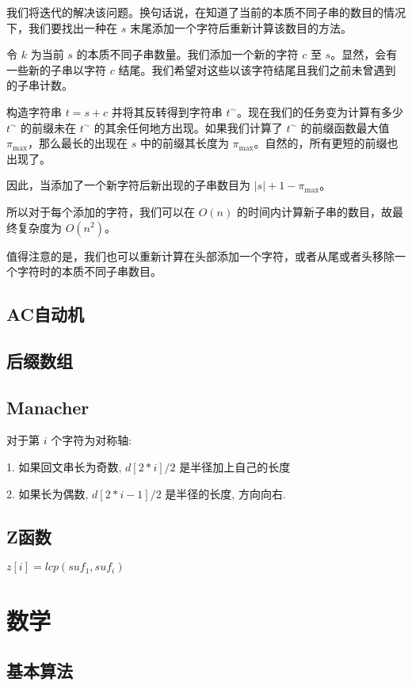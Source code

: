 \documentclass[a4paper]{article}
\begin{document}
我们将迭代的解决该问题。换句话说，在知道了当前的本质不同子串的数目的情况下，我们要找出一种在 $s$ 末尾添加一个字符后重新计算该数目的方法。

令 $k$ 为当前 $s$ 的本质不同子串数量。我们添加一个新的字符 $c$ 至 $s$。显然，会有一些新的子串以字符 $c$ 结尾。我们希望对这些以该字符结尾且我们之前未曾遇到的子串计数。

构造字符串 $t = s + c$ 并将其反转得到字符串 $t^{\sim}$。现在我们的任务变为计算有多少 $t^{\sim}$ 的前缀未在 $t^{\sim}$ 的其余任何地方出现。如果我们计算了 $t^{\sim}$ 的前缀函数最大值 $\pi_{\max}$，那么最长的出现在 $s$ 中的前缀其长度为 $\pi_{\max}$。自然的，所有更短的前缀也出现了。

因此，当添加了一个新字符后新出现的子串数目为 $|s| + 1 - \pi_{\max}$。

所以对于每个添加的字符，我们可以在 $O(n)$ 的时间内计算新子串的数目，故最终复杂度为 $O(n^2)$。

值得注意的是，我们也可以重新计算在头部添加一个字符，或者从尾或者头移除一个字符时的本质不同子串数目。

\subsection{AC自动机}


\subsection{后缀数组}


\subsection{Manacher}
对于第 $i$ 个字符为对称轴: 

1. 如果回文串长为奇数, $d[2 * i]/2$ 是半径加上自己的长度

2. 如果长为偶数, $d[2 * i -1]/2$ 是半径的长度, 方向向右. 


\subsection{Z函数}
$z[i]=lcp(suf_1, suf_i)$

\section{数学}
\subsection{基本算法}

\end{document}
